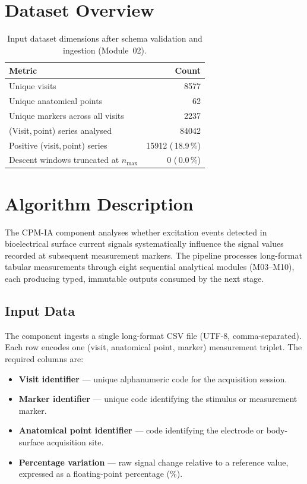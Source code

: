 \documentclass[a4paper,11pt]{article}
\begin{document}
\section{Dataset Overview}

\begin{table}[h!]
\centering
\small
\caption{Input dataset dimensions after schema validation and ingestion (Module~02).}
\begin{tabular}{lr}
\toprule
\textbf{Metric} & \textbf{Count} \\
\midrule
Unique visits                          & 8577 \\
Unique anatomical points               & 62 \\
Unique markers across all visits       & 2237 \\
(Visit,\,point) series analysed        & 84042 \\
Positive (visit,\,point) series        & 15912 (\,18.9\,\%) \\
Descent windows truncated at $n_{\max}$ & 0 (\,0.0\,\%) \\
\bottomrule
\end{tabular}
\end{table}

\section{Algorithm Description}

The CPM-IA component analyses whether excitation events detected in bioelectrical surface
current signals systematically influence the signal values recorded at subsequent measurement
markers. The pipeline processes long-format tabular measurements through eight sequential
analytical modules (M03--M10), each producing typed, immutable outputs consumed by the next
stage.

\subsection{Input Data}

The component ingests a single long-format CSV file (UTF-8, comma-separated). Each row
encodes one (visit, anatomical point, marker) measurement triplet. The required columns are:

\begin{itemize}
  \item \textbf{Visit identifier} --- unique alphanumeric code for the acquisition session.
  \item \textbf{Marker identifier} --- unique code identifying the stimulus or measurement
        marker.
  \item \textbf{Anatomical point identifier} --- code identifying the electrode or
        body-surface acquisition site.
  \item \textbf{Percentage variation} --- raw signal change relative to a reference value,
        expressed as a floating-point percentage (\%).
\end{itemize}
\end{document}
